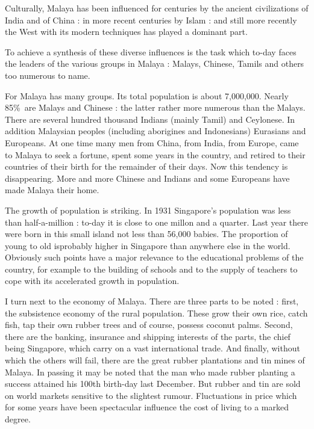 Culturally, Malaya has been influenced for centuries by the ancient civilizations of India and of China : in more recent centuries by Islam : and still more recently the West with its modern techniques has played a dominant part.

To achieve a synthesis of these diverse influences is the task which to-day faces the leaders of the various groups in Malaya : Malays, Chinese, Tamils and others too numerous to name.

For Malaya has many groups. Its total population is about 7,000,000. Nearly 85\%\ are Malays and Chinese : the latter rather more numerous than the Malays. There are several hundred thousand Indians (mainly Tamil) and Ceylonese. In addition Malaysian peoples (including aborigines and Indonesians) Eurasians and Europeans. At one time many men from China, from India, from Europe, came to Malaya to seek a fortune, spent some years in the country, and retired to their countries of their birth for the remainder of their days. Now this tendency is disappearing. More and more Chinese and Indians and some Europeans have made Malaya their home.

The growth of population is striking. In 1931 Singapore's population was less than half-a-million : to-day it is close to one millon and a quarter. Last year there were born in this small island not less than 56,000 babies. The proportion of young to old is\pageoriginale probably higher in Singapore than anywhere else in the world. Obviously such points have a major relevance to the educational problems of the country, for example to the building of schools and to the supply of teachers to cope with its accelerated growth in population.

I turn next to the economy of Malaya. There are three parts to be noted : first, the subsistence economy of the rural population. These grow their own rice, catch fish, tap their own rubber trees and of course, possess coconut palms. Second, there are the banking, insurance and shipping interests of the parts, the chief being Singapore, which carry on a vast international trade. And finally, without which the others will fail, there are the great rubber plantations and tin mines of Malaya. In passing it may be noted that the man who made rubber planting a success attained his 100th birth-day last December. But rubber and tin are sold on world markets sensitive to the slightest rumour. Fluctuations in price which for some years have been spectacular influence the cost of living to a marked degree.

